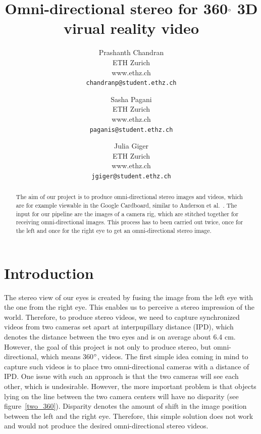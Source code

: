 \documentclass[10pt,twocolumn,letterpaper]{article}
\begin{document}
\title{Omni-directional stereo for 360$\degree$ 3D virual reality video}

\author{Prashanth Chandran\\
ETH Zurich\\
www.ethz.ch\\
{\tt\small chandranp@student.ethz.ch}
\and
Sasha Pagani\\
ETH Zurich\\
www.ethz.ch\\
{\tt\small paganis@student.ethz.ch}
\and
Julia Giger\\
ETH Zurich\\
www.ethz.ch\\
{\tt\small jgiger@student.ethz.ch}
}

\maketitle

\begin{abstract}
   The aim of our project is to produce omni-directional stereo images and videos, which are for example viewable in the Google Cardboard, similar to Anderson et al.~\cite{jump16}. The input for our pipeline are the images of a camera rig, which are stitched together for receiving omni-directional images. This process has to been carried out twice, once for the left and once for the right eye to get an omni-directional stereo image.
\end{abstract}

\section{Introduction}

The stereo view of our eyes is created by fusing the image from the left eye with the one from the right eye. This enables us to perceive a stereo impression of the world. Therefore, to produce stereo videos, we need to capture synchronized videos from two cameras set apart at interpupillary distance (IPD), which denotes the distance between the two eyes and is on average about 6.4 cm. However, the goal of this project is not only to produce stereo, but omni-directional, which means 360$\degree$, videos. The first simple idea coming in mind to capture such videos is to place two omni-directional cameras with a distance of IPD. One issue with such an approach is that the two cameras will see each other, which is undesirable. However, the more important problem is that objects lying on the line between the two camera centers will have no disparity (see figure~\ref{two_360}). Disparity denotes the amount of shift in the image position between the left and the right eye. Therefore, this simple solution does not work and would not produce the desired omni-directional stereo videos.
\end{document}
